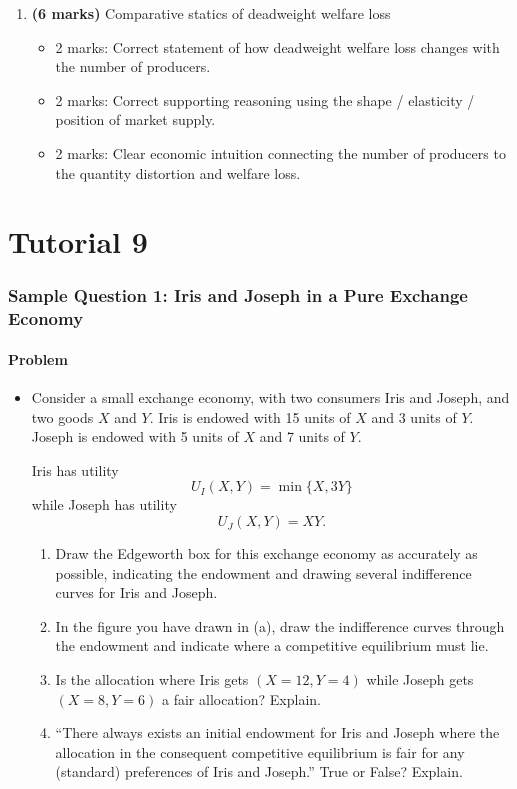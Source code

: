\documentclass[12pt]{article}
\begin{document}
\begin{enumerate}[label=(\alph*)]
    \item \textbf{(6 marks)} Comparative statics of deadweight welfare loss
    \begin{itemize}
        \item 2 marks: Correct statement of how deadweight welfare loss changes with the number of producers.
        \item 2 marks: Correct supporting reasoning using the shape / elasticity / position of market supply.
        \item 2 marks: Clear economic intuition connecting the number of producers to the quantity distortion and welfare loss.
    \end{itemize}
\end{enumerate}



\newpage
\part{Tutorial 9}
\section{Sample Question 1: Iris and Joseph in a Pure Exchange Economy}

\subsection{Problem}
\begin{itemize}
    \item Consider a small exchange economy, with two consumers Iris and Joseph, and two goods \(X\) and \(Y\). Iris is endowed with 15 units of \(X\) and 3 units of \(Y\). Joseph is endowed with 5 units of \(X\) and 7 units of \(Y\).

    Iris has utility
    \[
    U_I(X,Y)=\min\{X,3Y\}
    \]
    while Joseph has utility
    \[
    U_J(X,Y)=XY.
    \]

    \begin{enumerate}[label=(\alph*)]
        \item Draw the Edgeworth box for this exchange economy as accurately as possible, indicating the endowment and drawing several indifference curves for Iris and Joseph.
        \item In the figure you have drawn in (a), draw the indifference curves through the endowment and indicate where a competitive equilibrium must lie.
        \item Is the allocation where Iris gets \((X=12,Y=4)\) while Joseph gets \((X=8,Y=6)\) a fair allocation? Explain.
        \item ``There always exists an initial endowment for Iris and Joseph where the allocation in the consequent competitive equilibrium is fair for any (standard) preferences of Iris and Joseph.'' True or False? Explain.
    \end{enumerate}
\end{itemize}
\end{document}
